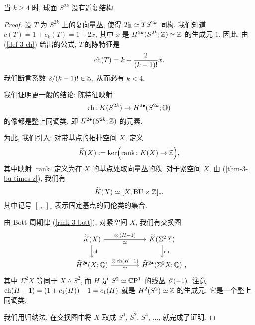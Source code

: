 \begin{lemma} \label{lem-4-sphere-2}
    当 $k \geq 4$ 时, 球面 $S^{2k}$ 没有近复结构.
\end{lemma}

\begin{proof}
    设 $T$ 为 $S^{2k}$ 上的复向量丛, 使得 $T_{\mathbb{R}} \simeq TS^{2k}$ 同构.
    我们知道 $c (T) = 1 + c_k (T) = 1 + 2x$, 其中 $x$ 是 $H^{2k} (S^{2k}; \mathbb{Z}) \simeq \mathbb{Z}$ 的生成元 $1$.
    因此, 由 (\ref{def-3-ch}) 给出的公式, $T$ 的陈特征是
    \[ \operatorname{ch} (T) = k + \frac {2} {(k-1)!} x. \]
    我们断言系数 $2/(k-1)! \in \mathbb{Z}$, 从而必有 $k < 4$.

    我们证明更一般的结论: 陈特征映射
    \[ \operatorname{ch} \colon K (S^{2k}) \to H^{2\bullet} (S^{2k}; \mathbb{Q}) \]
    的像都是整上同调类, 即 $H^{2\bullet} (S^{2k}; \mathbb{Z})$ 的元素.

    为此, 我们引入: 对带基点的拓扑空间 $X$, 定义
    \[ \widetilde{K} (X) := \ker \Bigl( \operatorname{rank} \colon K(X) \to \mathbb{Z} \Bigr), \]
    其中映射 $\operatorname{rank}$ 定义为在 $X$ 的基点处取向量丛的秩.
    对于紧空间 $X$, 由 (\ref{thm-3-bu-times-z}), 我们有
    \[ \widetilde{K} (X) \simeq [X, \mathrm{B} \mathrm{U} \times \mathbb{Z}]_*, \]
    其中记号 $[\ ,\ ]_*$ 表示固定基点的同伦类的集合.

    由 Bott 周期律 (\ref{rmk-3-bott}), 对紧空间 $X$, 我们有交换图
    \[ \begin{tikzcd}[column sep=4em]
        \widetilde{K} (X) \ar[d, "\ch"] \ar[r, "\otimes \, (H-1)", "\simeq"'] &
        \widetilde{K} (\Sigma^2 X) \ar[d, "\ch"] \\
        \widetilde{H}^{2\bullet} (X; \bbQ) \ar[r, "\otimes \ch (H-1)", "\simeq"'] &
        \widetilde{H}^{2\bullet} (\Sigma^2 X; \bbQ) \rlap{ ,}
    \end{tikzcd} \]
    其中 $\Sigma^2 X$ 等同于 $X \wedge S^2$,
    而 $H$ 是 $S^2 \simeq \mathbb{C} \mathrm{P}^1$ 的线丛 $\mathscr{O} (-1)$.
    注意 $\operatorname{ch} (H-1) = (1 + c_1(H)) - 1 = c_1 (H)$ 就是 $H^2 (S^2) \simeq \mathbb{Z}$ 的生成元,
    它是一个整上同调类.

    我们用归纳法, 在交换图中将 $X$ 取成 $S^0$, $S^2$, $S^4$, $\dotsc$, 就完成了证明.
\end{proof}

